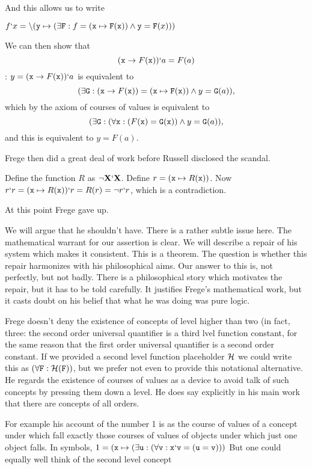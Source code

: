 \documentclass[12pt]{article}
\begin{document}
And this allows us to write 

$f`x = \backslash({\tt y}\mapsto (\exists {\tt F}: f = ({\tt x} \mapsto {\tt F}({\tt x})) \wedge {\tt y} = {\tt F}(x)))$

We can then show that $$({\tt x} \rightarrow F({\tt x}))`a = F(a)$$:  $y = ({\tt x} \rightarrow F({\tt x}))`a$ is equivalent to $$(\exists {\tt G}:  ({\tt x} \rightarrow F({\tt x}))= ({\tt x} \mapsto {\tt F}({\tt x})) \wedge y = {\tt G}(a)),$$ which by the axiom of courses of values is equivalent to $$(\exists {\tt G}:  (\forall {\tt x}:({F}({\tt x}) = {\tt G}({\tt x})) \wedge y = {\tt G}(a)),$$ and this is equivalent to $y=F(a)$.

Frege then did a great deal of work before Russell disclosed the scandal.

Define the function $R$ as $\neg {\bf X}`{\bf X}$.  Define $r = ({\tt x} \mapsto R({\tt x}))$.  Now $r`r = ({\tt x} \mapsto R({\tt x}))`r = R(r) = \neg r`r$, which is a contradiction.

At this point Frege gave up.

We will argue that he shouldn't have.  There is a rather subtle issue here.  The mathematical warrant for our assertion is clear.  We will describe a repair of his system which makes it consistent.  This is a theorem.  The question is whether this repair harmonizes with his philosophical aims.  Our answer to this is, not perfectly, but not badly.  There is a philosophical story which motivates the repair, but it has to be told carefully.  It justifies Frege's mathematical work, but it casts doubt on his belief that what he was doing was pure logic.

Frege doesn't deny the existence of concepts of level higher than two (in fact, three:  the second order universal quantifier is a third lvel function constant, for the same reason that the first order universal quantifier is a second order constant.  If we provided a second level function placeholder ${\bf \cal H}$ we could write this as $(\forall {\tt F}:{\bf \cal H}({\tt F}))$, but we prefer not even to provide this notational alternative.  He regards the existence of courses of values as a device to avoid talk of such concepts by pressing them down a level.  He does say explicitly in his main work that there are concepts of all orders.

For example his account of the number 1 is as the course of values of a concept under which fall exactly those courses of values of objects under which just one object falls.
In symbols, $1 =  ({\tt x} \mapsto (\exists {\tt u}:(\forall {\tt v}:{\tt x}`{\tt v} = ({\tt u}={\tt v})))$  But one could equally well think of the second level concept 
\end{document}
